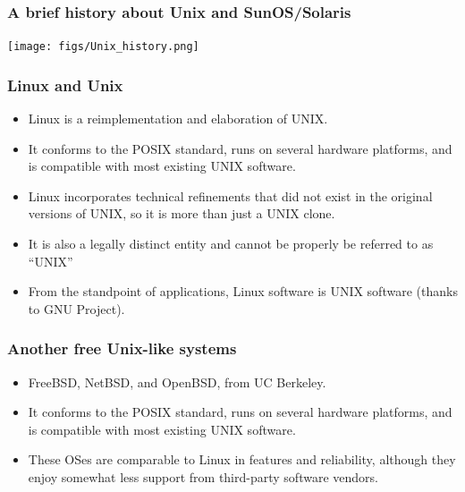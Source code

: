\documentclass{beamer}
\begin{document}

\begin{frame}
\frametitle{A brief history about Unix and SunOS/Solaris}
\begin{center}
  \texttt{[image: figs/Unix\_history.png]}
\end{center}
\end{frame}


\begin{frame}
\frametitle{Linux and Unix}

\begin{itemize}
\item Linux is a reimplementation and elaboration of UNIX. 
\item It conforms to the POSIX standard, runs on several hardware platforms, and is compatible with most existing UNIX software.
\item Linux incorporates technical refinements that did not exist in the original versions of UNIX, so it is more than just a UNIX clone.
\item It is also a legally distinct entity and cannot be properly be referred to as ``UNIX''
\item From the standpoint of applications, Linux software is UNIX software (thanks to GNU Project). 
\end{itemize}
\end{frame}


\begin{frame}
\frametitle{Another free Unix-like systems}

\begin{itemize}
\item FreeBSD, NetBSD, and OpenBSD, from UC Berkeley. 
\item It conforms to the POSIX standard, runs on several hardware platforms, and is compatible with most existing UNIX software.
\item These OSes are comparable to Linux in features and reliability, although they enjoy somewhat less support from third-party software vendors.
\end{itemize}
\end{frame}

\end{document}
